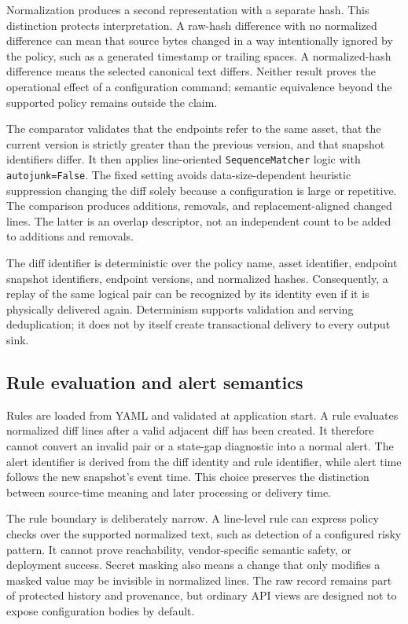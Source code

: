 \documentclass[a4paper,11pt]{article}
\begin{document}
Normalization produces a second representation with a separate hash. This distinction protects interpretation. A raw-hash difference with no normalized difference can mean that source bytes changed in a way intentionally ignored by the policy, such as a generated timestamp or trailing spaces. A normalized-hash difference means the selected canonical text differs. Neither result proves the operational effect of a configuration command; semantic equivalence beyond the supported policy remains outside the claim.

The comparator validates that the endpoints refer to the same asset, that the current version is strictly greater than the previous version, and that snapshot identifiers differ. It then applies line-oriented \texttt{SequenceMatcher} logic with \texttt{autojunk=False}. The fixed setting avoids data-size-dependent heuristic suppression changing the diff solely because a configuration is large or repetitive. The comparison produces additions, removals, and replacement-aligned changed lines. The latter is an overlap descriptor, not an independent count to be added to additions and removals.

The diff identifier is deterministic over the policy name, asset identifier, endpoint snapshot identifiers, endpoint versions, and normalized hashes. Consequently, a replay of the same logical pair can be recognized by its identity even if it is physically delivered again. Determinism supports validation and serving deduplication; it does not by itself create transactional delivery to every output sink.

\subsection{Rule evaluation and alert semantics}

Rules are loaded from YAML and validated at application start. A rule evaluates normalized diff lines after a valid adjacent diff has been created. It therefore cannot convert an invalid pair or a state-gap diagnostic into a normal alert. The alert identifier is derived from the diff identity and rule identifier, while alert time follows the new snapshot's event time. This choice preserves the distinction between source-time meaning and later processing or delivery time.

The rule boundary is deliberately narrow. A line-level rule can express policy checks over the supported normalized text, such as detection of a configured risky pattern. It cannot prove reachability, vendor-specific semantic safety, or deployment success. Secret masking also means a change that only modifies a masked value may be invisible in normalized lines. The raw record remains part of protected history and provenance, but ordinary API views are designed not to expose configuration bodies by default.
\end{document}
